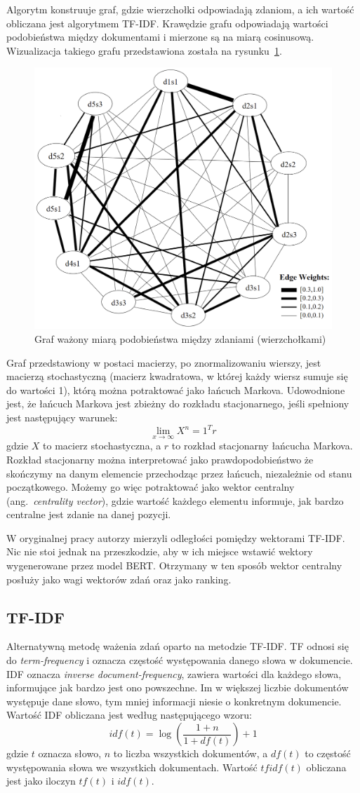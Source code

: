 		Algorytm konstruuje graf, gdzie wierzchołki odpowiadają zdaniom, a ich wartość obliczana jest algorytmem TF-IDF\@.
		Krawędzie grafu odpowiadają wartości podobieństwa między dokumentami i mierzone są na miarą cosinusową.
		Wizualizacja takiego grafu przedstawiona została na rysunku~\ref{fig:lexrank}.
		\begin{figure}[ht]\label{fig:lexrank}
			\centering
			\includegraphics[width=0.3\linewidth]{rys03/lexrank.png}
			\caption{Graf ważony miarą podobieństwa między zdaniami (wierzchołkami)\cite{LexRank}}
		\end{figure}
		Graf przedstawiony w postaci macierzy, po znormalizowaniu wierszy, jest macierzą stochastyczną
			(macierz kwadratowa, w której każdy wiersz sumuje się do wartości 1), którą można potraktować jako łańcuch Markova.
		Udowodnione jest, że łańcuch Markova jest zbieżny do rozkładu stacjonarnego, jeśli spełniony jest następujący warunek:
		\[\lim_{x \to \infty}X^n = 1^T r\]
		gdzie \(X\) to macierz stochastyczna, a \(r\) to rozkład stacjonarny łańcucha Markova.
		Rozkład stacjonarny można interpretować jako prawdopodobieństwo że skończymy na danym elemencie przechodząc przez łańcuch, niezależnie od stanu początkowego.
		Możemy go więc potraktować jako wektor centralny (ang.\ \emph{centrality vector}),
			gdzie wartość każdego elementu informuje, jak bardzo centralne jest zdanie na danej pozycji.

		W oryginalnej pracy autorzy mierzyli odległości pomiędzy wektorami TF-IDF\@.
		Nic nie stoi jednak na przeszkodzie, aby w ich miejsce wstawić wektory wygenerowane przez model BERT\@.
		Otrzymany w ten sposób wektor centralny posłuży jako wagi wektorów zdań oraz jako ranking.

	\subsection{TF-IDF}
		Alternatywną metodę ważenia zdań oparto na metodzie TF-IDF\@.
		TF odnosi się do \emph{term-frequency} i oznacza częstość występowania danego słowa w dokumencie.
		IDF oznacza \emph{inverse document-frequency}, zawiera wartości dla każdego słowa, informujące jak bardzo jest ono powszechne.
		Im w większej liczbie dokumentów występuje dane słowo, tym mniej informacji niesie o konkretnym dokumencie.
		Wartość IDF obliczana jest według następującego wzoru:
		\[idf(t)=\log\left(\frac{1+n}{1+df(t)}\right) + 1\]
		gdzie \(t\) oznacza słowo, \(n\) to liczba wszystkich dokumentów, a \(df(t)\) to częstość występowania słowa we wszystkich dokumentach.
		Wartość \(tfidf(t)\) obliczana jest jako iloczyn \(tf(t)\) i \(idf(t)\).
		
